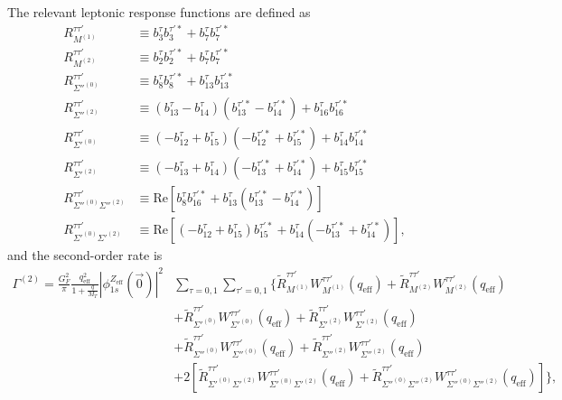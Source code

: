 \documentclass[12pt,letterpaper]{book}
\begin{document}
The relevant leptonic response functions are defined as
\begin{equation}
\begin{split}
R^{\tau\tau'}_{M^{(1)}}&\equiv b_3^{\tau}b_3^{\tau'*}+b_7^{\tau}b_7^{\tau'*}\\
R^{\tau\tau'}_{M^{(2)}}&\equiv b_2^{\tau}b_2^{\tau'*}+b_7^{\tau}b_7^{\tau'*}\\
R^{\tau\tau'}_{\Sigma''^{(0)}}&\equiv b_8^{\tau}b_8^{\tau'*}+b_{13}^{\tau}b_{13}^{\tau'*}\\
R^{\tau\tau'}_{\Sigma''^{(2)}}&\equiv (b_{13}^{\tau}-b_{14}^{\tau})(b_{13}^{\tau'*}-b_{14}^{\tau'*})+b_{16}^{\tau}b_{16}^{\tau'*}\\
R^{\tau\tau'}_{\Sigma'^{(0)}}&\equiv (-b_{12}^{\tau}+b_{15}^{\tau})(-b_{12}^{\tau'*}+b_{15}^{\tau'*})+b_{14}^{\tau}b_{14}^{\tau'*}\\
R^{\tau\tau'}_{\Sigma'^{(2)}}&\equiv (-b_{13}^{\tau}+b_{14}^{\tau})(-b_{13}^{\tau'*}+b_{14}^{\tau'*})+b_{15}^{\tau}b_{15}^{\tau'*}\\
R^{\tau\tau'}_{\Sigma''^{(0)}\Sigma''^{(2)}}&\equiv \mathrm{Re}\left[b_8^{\tau}b_{16}^{\tau'*}+b_{13}^{\tau}(b_{13}^{\tau'*}-b_{14}^{\tau'*})\right]\\
R^{\tau\tau'}_{\Sigma'^{(0)}\Sigma'^{(2)}}&\equiv \mathrm{Re}\left[(-b_{12}^{\tau}+b_{15}^{\tau})b_{15}^{\tau'*}+b_{14}^{\tau}(-b_{13}^{\tau'*}+b_{14}^{\tau'*})\right],
\end{split}
\end{equation}
and the second-order rate is
\begin{equation}
\begin{split}
\Gamma^{(2)}=\frac{G_F^2}{\pi}\frac{q_\mathrm{eff}^2}{1+\frac{q}{M_T}}|\phi_{1s}^{Z_\mathrm{eff}}(\vec{0})|^2&\sum_{\tau=0,1}\sum_{\tau'=0,1}\Bigg\{\tilde{R}_{M^{(1)}}^{\tau\tau'}W_{M^{(1)}}^{\tau\tau'}(q_\mathrm{eff})+\tilde{R}_{M^{(2)}}^{\tau\tau'}W_{M^{(2)}}^{\tau\tau'}(q_\mathrm{eff})\\
&+\tilde{R}_{\Sigma'^{(0)}}^{\tau\tau'}W_{\Sigma'^{(0)}}^{\tau\tau'}(q_\mathrm{eff})+\tilde{R}_{\Sigma'^{(2)}}^{\tau\tau'}W_{\Sigma'^{(2)}}^{\tau\tau'}(q_\mathrm{eff})\\
&+\tilde{R}_{\Sigma''^{(0)}}^{\tau\tau'}W_{\Sigma''^{(0)}}^{\tau\tau'}(q_\mathrm{eff})+\tilde{R}_{\Sigma''^{(2)}}^{\tau\tau'}W_{\Sigma''^{(2)}}^{\tau\tau'}(q_\mathrm{eff})\\
&+2\left[\tilde{R}_{\Sigma'^{(0)}\Sigma'^{(2)}}^{\tau\tau'}W_{\Sigma'^{(0)}\Sigma'^{(2)}}^{\tau\tau'}(q_\mathrm{eff})+\tilde{R}_{\Sigma''^{(0)}\Sigma''^{(2)}}^{\tau\tau'}W_{\Sigma''^{(0)}\Sigma''^{(2)}}^{\tau\tau'}(q_\mathrm{eff})\right]\Bigg\},
\end{split}
\label{eq:decay_second_lower}
\end{equation}
\end{document}

